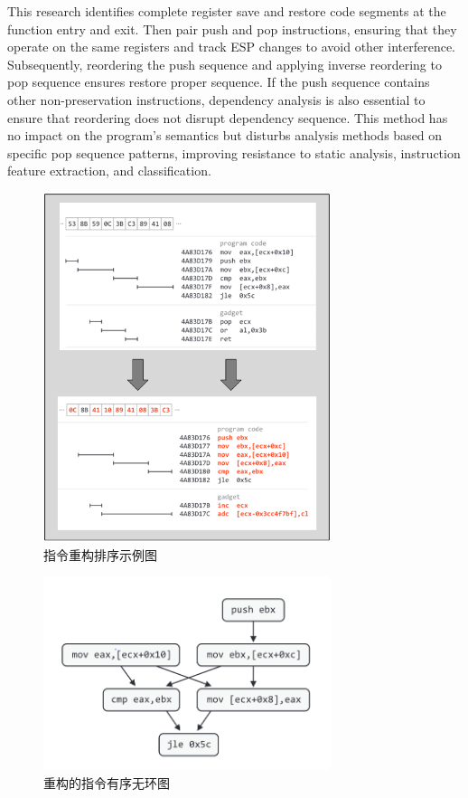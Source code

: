 This research identifies complete register save and restore code segments at the function entry and exit. Then pair push and pop instructions, ensuring that they operate on the same registers and track ESP changes to avoid other interference. Subsequently, reordering the push sequence and applying inverse reordering to pop sequence ensures restore proper sequence. If the push sequence contains other non-preservation instructions, dependency analysis is also essential to ensure that reordering does not disrupt dependency sequence. This method has no impact on the program's semantics but disturbs analysis methods based on specific pop sequence patterns, improving resistance to static analysis, instruction feature extraction, and classification.

\begin{figure}[hbt]
	\centering
	\includegraphics[width=0.75\textwidth]{figures/4.3}
	\caption{指令重构排序示例图}\label{fig:4.3}
\end{figure}

\begin{figure}[hbt]
	\centering
	\includegraphics[width=0.75\textwidth]{figures/4.4}
	\caption{重构的指令有序无环图}\label{fig:4.4}
\end{figure}

